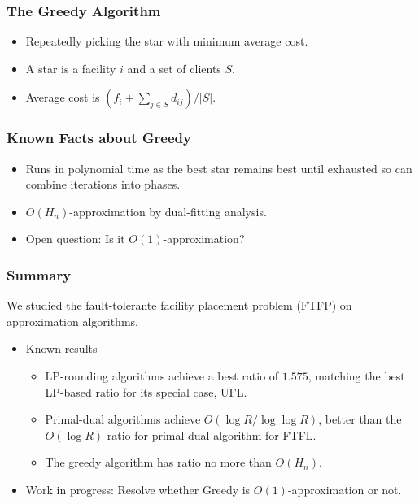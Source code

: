\documentclass[handout, hyperref, xcolor=dvipsnames]{beamer}
\begin{document}
\begin{frame}
  \frametitle{The Greedy Algorithm}
  \begin{itemize}
  \item Repeatedly picking the star with minimum average cost.
  \item A star is a facility $i$ and a set of clients $S$.
  \item Average cost is $ (f_i + \sum_{j\in S} d_{ij}) / |S|$.
  \end{itemize}
\end{frame}

\begin{frame}
  \frametitle{Known Facts about Greedy}
  \begin{itemize}
  \item Runs in polynomial time as the best star remains best until
    exhausted so can combine iterations into phases.
  \item $O(H_n)$-approximation by dual-fitting analysis.
  \item Open question: Is it $O(1)$-approximation?
  \end{itemize}
\end{frame}

\begin{frame}
  \frametitle{Summary} We studied the fault-tolerante facility
  placement problem (FTFP) on approximation algorithms.

  \begin{itemize}
  \item Known results
    \begin{itemize}
    \item LP-rounding algorithms achieve a best ratio of $1.575$,
      matching the best LP-based ratio for its special case, UFL.
    \item Primal-dual algorithms achieve $O(\log R/\log\log R)$,
      better than the $O(\log R)$ ratio for primal-dual algorithm for
      FTFL.
    \item The greedy algorithm has ratio no more than $O(H_n)$.
  \end{itemize}
  \item Work in progress:
    Resolve whether Greedy is $O(1)$-approximation or not.
  \end{itemize}
\end{frame}
\end{document}
